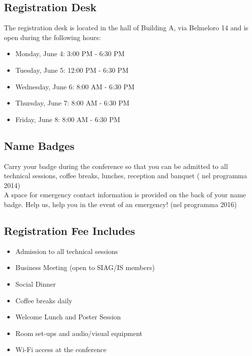 \newpage
\begin{multicols}{2}
\section*{Registration Desk}
The registration desk is located in the hall of Building A, via Belmeloro 14 and is open during the following hours:
\begin{itemize}
\item Monday, June 4: 3:00 PM - 6:30 PM
\item Tuesday, June 5: 12:00 PM - 6:30 PM
\item Wednesday, June 6: 8:00 AM - 6:30 PM
\item Thursday, June 7: 8:00 AM - 6:30 PM
\item Friday, June 8: 8:00 AM - 6:30 PM
\end{itemize}
\subsection*{Name Badges} Carry your badge during the conference so that you can be admitted to all technical sessions, coffee breaks, lunches, reception and banquet ( nel programma 2014)\\
A space for emergency contact information is provided on the back of your name badge. Help us, help you in the event of an emergency! (nel programma 2016)
\subsection*{Registration Fee Includes}
\begin{itemize}
\item Admission to all technical sessions
\item Business Meeting (open to SIAG/IS members)
\item Social Dinner
\item Coffee breaks daily
\item Welcome Lunch and Poster Session
\item Room set-ups and audio/visual equipment
\item Wi-Fi access at the conference
\end{itemize}%

\end{multicols}
